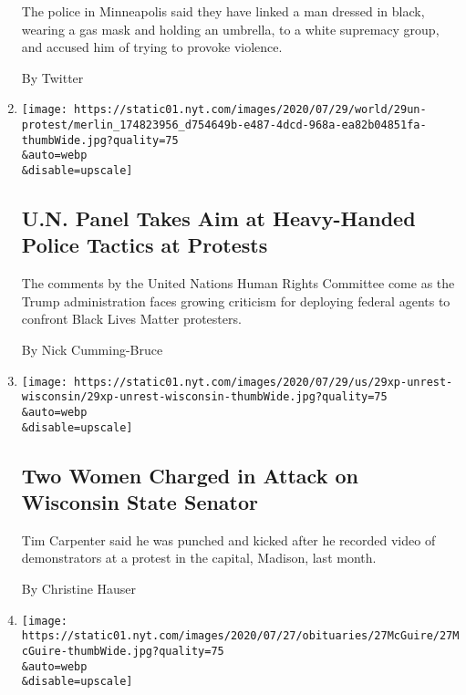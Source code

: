 \begin{enumerate}
  The police in Minneapolis said they have linked a man dressed in
  black, wearing a gas mask and holding an umbrella, to a white
  supremacy group, and accused him of trying to provoke violence.

  By Twitter
\item
  \href{/2020/07/29/world/americas/united-nations-portland-protests.html}{}

  \texttt{[image: https://static01.nyt.com/images/2020/07/29/world/29un-protest/merlin\_174823956\_d754649b-e487-4dcd-968a-ea82b04851fa-thumbWide.jpg?quality=75\\\&auto=webp\\\&disable=upscale]}

  \hypertarget{un-panel-takes-aim-at-heavy-handed-police-tactics-at-protests}{%
  \subsection{U.N. Panel Takes Aim at Heavy-Handed Police Tactics at
  Protests}\label{un-panel-takes-aim-at-heavy-handed-police-tactics-at-protests}}

  The comments by the United Nations Human Rights Committee come as the
  Trump administration faces growing criticism for deploying federal
  agents to confront Black Lives Matter protesters.

  By Nick Cumming-Bruce
\item
  \href{/2020/07/29/us/wisconsin-tim-carpenter-attacked.html}{}

  \texttt{[image: https://static01.nyt.com/images/2020/07/29/us/29xp-unrest-wisconsin/29xp-unrest-wisconsin-thumbWide.jpg?quality=75\\\&auto=webp\\\&disable=upscale]}

  \hypertarget{two-women-charged-in-attack-on-wisconsin-state-senator}{%
  \subsection{Two Women Charged in Attack on Wisconsin State
  Senator}\label{two-women-charged-in-attack-on-wisconsin-state-senator}}

  Tim Carpenter said he was punched and kicked after he recorded video
  of demonstrators at a protest in the capital, Madison, last month.

  By Christine Hauser
\item
  \href{/2020/07/29/obituaries/renada-mcguire-dead-coronavirus.html}{}

  \texttt{[image: https://static01.nyt.com/images/2020/07/27/obituaries/27McGuire/27McGuire-thumbWide.jpg?quality=75\\\&auto=webp\\\&disable=upscale]}


\end{enumerate}
